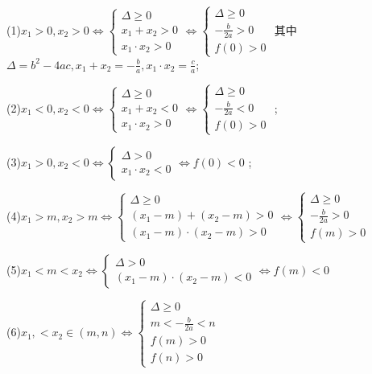 \documentclass[10pt,a4paper]{ctexbook}
\begin{document}
(1)\quad $\displaystyle x_{1}>0,x_2>0 \Leftrightarrow \left\{
\begin{aligned}
\Delta \ge 0 \\
x_1+x_2>0 \\
x_1 \cdot x_2 > 0
\end{aligned}
\right. 
\Leftrightarrow 
\left\{
\begin{aligned}
\Delta \ge 0 \\
-\frac{b}{2a}>0 \\
f(0) > 0
\end{aligned}
\right. 
$   其中$\displaystyle \Delta=b^2-4ac,x_1+x_2=-\frac{b}{a},x_1 \cdot x_2=\frac{c}{a}$;\par

(2)\quad $\displaystyle x_{1}<0,x_2<0 \Leftrightarrow \left\{
\begin{aligned}
\Delta \ge 0 \\
x_1+x_2<0 \\
x_1 \cdot x_2 > 0
\end{aligned}
\right. 
\Leftrightarrow 
\left\{
\begin{aligned}
\Delta \ge 0 \\
-\frac{b}{2a}<0 \\
f(0) > 0
\end{aligned}
\right. 
$ ;\par
(3)\quad $\displaystyle x_{1}>0,x_2<0 \Leftrightarrow \left\{
\begin{aligned}
\Delta > 0 \\
x_1 \cdot x_2 < 0
\end{aligned}
\right. 
\Leftrightarrow 
f(0) < 0
$ ;\par
(4)\quad $\displaystyle x_{1}>m,x_2>m \Leftrightarrow \left\{
\begin{aligned}
\Delta \ge 0 \\
(x_1-m)+(x_2-m)>0 \\
(x_1-m)\cdot(x_2-m) > 0
\end{aligned}
\right. 
\Leftrightarrow 
\left\{
\begin{aligned}
\Delta \ge 0 \\
-\frac{b}{2a}>0 \\
f(m) > 0
\end{aligned} 
\right. 
$\par
(5)\quad $\displaystyle x_{1}<m<x_2 \Leftrightarrow \left\{
\begin{aligned}
\Delta > 0 \\
(x_1-m)\cdot(x_2-m) < 0
\end{aligned}
\right. 
\Leftrightarrow 
f(m) < 0
$\par
(6)\quad $\displaystyle x_{1},<x_2 \in(m,n) \Leftrightarrow \left\{
\begin{aligned}
\Delta \ge 0 \\
m<-\frac{b}{2a}<n \\
f(m) > 0\\
f(n) > 0
\end{aligned}
\right. 
$
\end{document}
